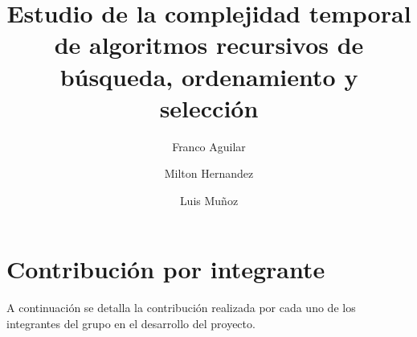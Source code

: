\documentclass[9pt,letterpaper,onecolumn]{rho-class/rho}
\title{Estudio de la complejidad temporal de algoritmos recursivos de búsqueda, ordenamiento y selección}
\author[$\dagger$]{Franco Aguilar}
\author[$\dagger$]{Milton Hernandez}
\author[$\dagger$]{Luis Muñoz}
\affil[$\dagger$]{Universidad de Magallanes}
\begin{document}
\maketitle
\thispagestyle{firststyle}
\tableofcontents


\newpage


\newpage

\newpage

\newpage
\section{Contribución por integrante}
A continuación se detalla la contribución realizada por cada uno de los integrantes del grupo en el desarrollo del proyecto.

\newpage

\newpage

\newpage


\newpage
\nocite{*}
\printbibliography
\end{document}
